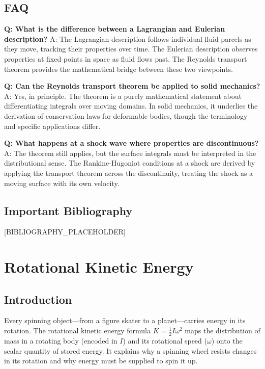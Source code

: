 \documentclass[11pt,openright]{book}
\begin{document}
\section*{FAQ}

\textbf{Q: What is the difference between a Lagrangian and Eulerian description?}
A: The Lagrangian description follows individual fluid parcels as they move, tracking their properties over time. The Eulerian description observes properties at fixed points in space as fluid flows past. The Reynolds transport theorem provides the mathematical bridge between these two viewpoints.

\textbf{Q: Can the Reynolds transport theorem be applied to solid mechanics?}
A: Yes, in principle. The theorem is a purely mathematical statement about differentiating integrals over moving domains. In solid mechanics, it underlies the derivation of conservation laws for deformable bodies, though the terminology and specific applications differ.

\textbf{Q: What happens at a shock wave where properties are discontinuous?}
A: The theorem still applies, but the surface integrals must be interpreted in the distributional sense. The Rankine-Hugoniot conditions at a shock are derived by applying the transport theorem across the discontinuity, treating the shock as a moving surface with its own velocity.
\section*{Important Bibliography}

[BIBLIOGRAPHY_PLACEHOLDER]


\chapter{Rotational Kinetic Energy}

\section*{Introduction}

Every spinning object---from a figure skater to a planet---carries energy in its rotation. The rotational kinetic energy formula $K = \frac{1}{2}I\omega^2$ maps the distribution of mass in a rotating body (encoded in $I$) and its rotational speed ($\omega$) onto the scalar quantity of stored energy. It explains why a spinning wheel resists changes in its rotation and why energy must be supplied to spin it up.
\end{document}

